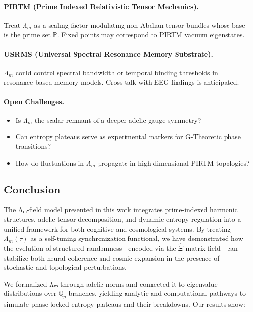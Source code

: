 \documentclass{article}
\theoremstyle{plain}
\theoremstyle{claimstyle}
\begin{document}
\paragraph{PIRTM (Prime Indexed Relativistic Tensor Mechanics).} 
Treat $\Lambda_m$ as a scaling factor modulating non-Abelian tensor bundles whose base is the prime set $\mathbb{P}$. Fixed points may correspond to PIRTM vacuum eigenstates.

\paragraph{USRMS (Universal Spectral Resonance Memory Substrate).} 
$\Lambda_m$ could control spectral bandwidth or temporal binding thresholds in resonance-based memory models. Cross-talk with EEG findings is anticipated.

\paragraph{Open Challenges.}
\begin{itemize}
    \item Is $\Lambda_m$ the scalar remnant of a deeper adelic gauge symmetry?
    \item Can entropy plateaus serve as experimental markers for G-Theoretic phase transitions?
    \item How do fluctuations in $\Lambda_m$ propagate in high-dimensional PIRTM topologies?
\end{itemize}

\subsection{Conclusion}

The Λₘ-field model presented in this work integrates prime-indexed harmonic structures, adelic tensor decomposition, and dynamic entropy regulation into a unified framework for both cognitive and cosmological systems. By treating $\Lambda_m(\tau)$ as a self-tuning synchronization functional, we have demonstrated how the evolution of structured randomness—encoded via the $\hat{\Xi}$ matrix field—can stabilize both neural coherence and cosmic expansion in the presence of stochastic and topological perturbations.

We formalized Λₘ through adelic norms and connected it to eigenvalue distributions over $\mathbb{Q}_p$ branches, yielding analytic and computational pathways to simulate phase-locked entropy plateaus and their breakdowns. Our results show:
\end{document}

